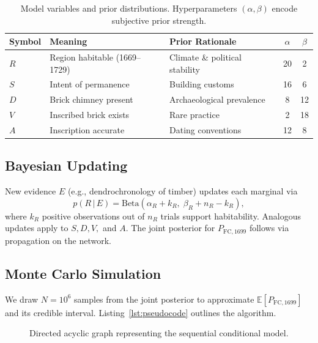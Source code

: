 \documentclass[11pt]{article}
\begin{document}
\begin{table}[ht]
  \centering
  \caption{Model variables and prior distributions. Hyperparameters $(\alpha,\beta)$ encode subjective prior strength.}
  \label{tab:variables}
  \begin{tabular}{@{}lllcc@{}}
    \toprule
    Symbol & Meaning & Prior Rationale & $\alpha$ & $\beta$\\
    \midrule
    $R$ & Region habitable (1669–1729) & Climate \& political stability & 20 & 2\\
    $S$ & Intent of permanence & Building customs & 16 & 6\\
    $D$ & Brick chimney present & Archaeological prevalence & 8 & 12\\
    $V$ & Inscribed brick exists & Rare practice & 2 & 18\\
    $A$ & Inscription accurate & Dating conventions & 12 & 8\\
    \bottomrule
  \end{tabular}
\end{table}

\subsection{Bayesian Updating}
New evidence $E$ (e.g., dendrochronology of timber) updates each marginal via
\begin{equation}
  p(R\,|\,E) = \text{Beta}(\alpha_R + k_R,\; \beta_R + n_R - k_R),
\end{equation}
where $k_R$ positive observations out of $n_R$ trials support habitability. Analogous updates apply to $S, D, V,$ and $A$. The joint posterior for $P_{\mathrm{FC},1699}$ follows via propagation on the network.

\subsection{Monte Carlo Simulation}
We draw $N=10^{6}$ samples from the joint posterior to approximate $\mathbb{E}[P_{\mathrm{FC},1699}]$ and its credible interval. Listing~\ref{lst:pseudocode} outlines the algorithm.

\begin{figure}[ht]
\centering
{}
\caption{Directed acyclic graph representing the sequential conditional model.}
\label{fig:dag}
\end{figure}
\end{document}
